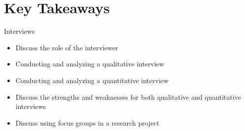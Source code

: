 \section{Key Takeaways}\label{ch10:summary}

\begin{center}
	\begin{tkawybox}{Interviews}
		\begin{itemize}
			\setlength{\itemsep}{0pt}
			\setlength{\parskip}{0pt}
			\setlength{\parsep}{0pt}
			
			\item Discuss the role of the interviewer
			\item Conducting and analyzing a qualitative interview
			\item Conducting and analyzing a quantitative interview
			\item Discuss the strengths and weaknesses for both qualitative and quantitative interviews
			\item Discuss using focus groups in a research project
			
		\end{itemize}
	\end{tkawybox}
\end{center}
